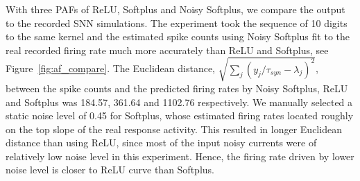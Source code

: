 \documentclass{article}
\begin{document}
With three PAFs of ReLU, Softplus and Noisy Softplus, we compare the output to the recorded SNN simulations.
The experiment took the sequence of 10 digits to the same kernel and the estimated spike counts using Noisy Softplus fit to the real recorded firing rate much more accurately than ReLU and Softplus, see Figure~\ref{fig:af_compare}.
The Euclidean distance, $\sqrt{\sum_{j}(y_j/\tau_{syn} - \lambda_j)^2}$, between the spike counts and the predicted firing rates by Noisy Softplus, ReLU and Softplus was 184.57, 361.64 and 1102.76 respectively.
We manually selected a static noise level of 0.45 for Softplus, whose estimated firing rates located roughly on the top slope of the real response activity.
This resulted in longer Euclidean distance than using ReLU, since most of the input noisy currents were of relatively low noise level in this experiment.
Hence, the firing rate driven by lower noise level is closer to ReLU curve than Softplus.
\end{document}
